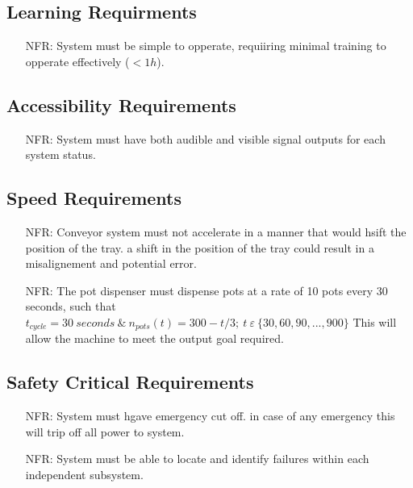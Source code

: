 \documentclass[12pt]{article}
\newcounter{nfrnum} %
\begin{document}
  \subsection{Learning Requirments}

  \noindent \begin{itemize}
  \item[NFR\refstepcounter{nfrnum}\thenfrnum \label{NFR_Portability3}:]
  System must be simple to opperate, requiiring minimal training to opperate effectively ($<1h$).

  \end{itemize}


  \subsection{Accessibility Requirements}
 \noindent \begin{itemize}
  \item[NFR\refstepcounter{nfrnum}\thenfrnum \label{NFR_Portability4}:]
  System must have both audible and visible signal outputs for each system status.
 \end{itemize}

  \subsection{Speed Requirements}
  \noindent \begin{itemize}
  \item[NFR\refstepcounter{nfrnum}\thenfrnum \label{NFR_Portability5}:]
  Conveyor system must not accelerate in a manner that would hsift the position of the tray. a shift in the position of the tray could result in a misalignement and potential error.
  
  \item[NFR\refstepcounter{nfrnum}\thenfrnum \label{NFR_Portability6}:] 
  {The pot dispenser must 
  dispense pots at a rate of 10 pots every 30 seconds, such that $t_{cycle}=30\ seconds
      \ \&\ n_{pots}\left(t\right)=300-t/3;\ t\ \varepsilon\ \{30, 60, 90, ..., 900\}$}
  This will allow the machine to meet the output goal required.
  \end{itemize}  


  \subsection{Safety Critical Requirements}
  \noindent \begin{itemize}
  \item[NFR\refstepcounter{nfrnum}\thenfrnum \label{NFR_Portability7}:]
  System must hgave emergency cut off. in case of any emergency this will trip off all power to system.
  
  \item[NFR\refstepcounter{nfrnum}\thenfrnum \label{NFR_Portability8}:]
  System must be able to locate and identify failures  within each independent subsystem.
  
  \end{itemize}
\end{document}
